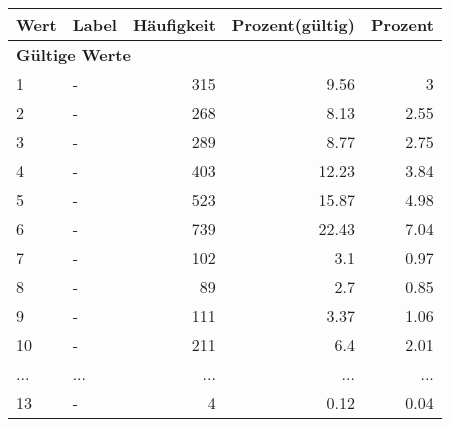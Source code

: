      \begin{longtable}{lXrrr}
     \toprule
     \textbf{Wert} & \textbf{Label} & \textbf{Häufigkeit} & \textbf{Prozent(gültig)} & \textbf{Prozent} \\
     \endhead
     \midrule
     \multicolumn{5}{l}{\textbf{Gültige Werte}}\\
        1 & \multicolumn{1}{X}{-} & %
          \num{315} &
          \num[round-mode=places,round-precision=2]{9,56} &
          \num[round-mode=places,round-precision=2]{3} \\
        2 & \multicolumn{1}{X}{-} & %
          \num{268} &
          \num[round-mode=places,round-precision=2]{8,13} &
          \num[round-mode=places,round-precision=2]{2,55} \\
        3 & \multicolumn{1}{X}{-} & %
          \num{289} &
          \num[round-mode=places,round-precision=2]{8,77} &
          \num[round-mode=places,round-precision=2]{2,75} \\
        4 & \multicolumn{1}{X}{-} & %
          \num{403} &
          \num[round-mode=places,round-precision=2]{12,23} &
          \num[round-mode=places,round-precision=2]{3,84} \\
        5 & \multicolumn{1}{X}{-} & %
          \num{523} &
          \num[round-mode=places,round-precision=2]{15,87} &
          \num[round-mode=places,round-precision=2]{4,98} \\
        6 & \multicolumn{1}{X}{-} & %
          \num{739} &
          \num[round-mode=places,round-precision=2]{22,43} &
          \num[round-mode=places,round-precision=2]{7,04} \\
        7 & \multicolumn{1}{X}{-} & %
          \num{102} &
          \num[round-mode=places,round-precision=2]{3,1} &
          \num[round-mode=places,round-precision=2]{0,97} \\
        8 & \multicolumn{1}{X}{-} & %
          \num{89} &
          \num[round-mode=places,round-precision=2]{2,7} &
          \num[round-mode=places,round-precision=2]{0,85} \\
        9 & \multicolumn{1}{X}{-} & %
          \num{111} &
          \num[round-mode=places,round-precision=2]{3,37} &
          \num[round-mode=places,round-precision=2]{1,06} \\
        10 & \multicolumn{1}{X}{-} & %
          \num{211} &
          \num[round-mode=places,round-precision=2]{6,4} &
          \num[round-mode=places,round-precision=2]{2,01} \\
       ... & ... & ... & ... & ... \\
        13 & \multicolumn{1}{X}{-} & %
          \num{4} &
          \num[round-mode=places,round-precision=2]{0,12} &
          \num[round-mode=places,round-precision=2]{0,04} \\


\end{longtable}
